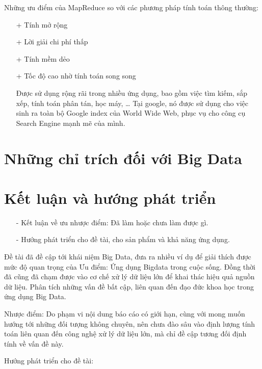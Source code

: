 \documentclass[12pt]{report}
\begin{document}
Những ưu điểm của MapReduce so với các phương pháp tính toán thông thường:
\begin{itemize}
\item[+] Tính mở rộng
\item[+] Lời giải chi phí thấp
\item[+] Tính mềm dẻo
\item[+] Tốc độ cao nhờ tính toán song song

Được sử dụng rộng rãi trong nhiều ứng dụng, bao gồm việc tìm kiếm, sắp xếp, tính toán phân tán, học máy, … Tại google, nó được sử dụng cho việc sinh ra toàn bộ Google index của World Wide Web, phục vụ cho công cụ Search Engine mạnh mẽ của mình.
\end{itemize}

\chapter*{Những chỉ trích đối với Big Data}

\chapter*{Kết luận và hướng phát triển}

\begin{itemize}
\large
\it
\item[-] Kết luận về ưu nhược điểm: Đã làm hoặc chưa làm được gì.
\item[-] Hướng phát triển cho đề tài, cho sản phẩm và khả năng ứng dụng.
\end{itemize}

Đề tài đã đề cập tới khái niệm Big Data, đưa ra nhiều ví dụ để giải thích được mức độ quan trọng của Ưu điểm: Ứng dụng Bigdata trong cuộc sống. Đồng thời đã cũng đã chạm được vào cơ chế xử lý dữ liệu lớn để khai thác hiệu quả nguồn dữ liệu. Phân tích những vấn đề bất cập, liên quan đến đạo đức khoa học trong ứng dụng Big Data. 

Nhược điểm: Do phạm vi nội dung báo cáo có giới hạn, cùng với mong muốn hướng tới những đối tượng không chuyên, nên chưa đào sâu vào định lượng tính toán liên quan đến công nghệ xử lý dữ liệu lớn, mà chỉ đề cập tương đối định tính về vấn đề này.

Hướng phát triển cho đề tài: 
\end{document}
